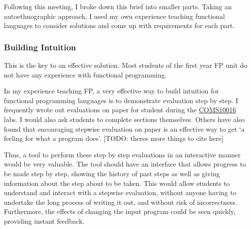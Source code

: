 Following this meeting, I broke down this brief into smaller parts. Taking an autoethnographic approach, I used my own experience teaching functional languages to consider solutions and come up with requirements for each part. 

\subsubsection{Building Intuition}
\label{building_intuition}
This is the key to an effective solution. Most students of the first year \ac{FP} unit do not have any experience with functional programming. 



In my experience teaching \ac{FP}, a very effective way to build intuition for functional programming languages is to demonstrate evaluation step by step. I frequently wrote out evaluations on paper for student during the \hyperref[COMS10016]{COMS10016} labs. I would also ask students to complete sections themselves. Others have also found that encouraging stepwise evaluation on paper is an effective way to get `a feeling for what a program does'. \cite{fp_first_year} [TODO: theres more things to cite here]

Thus, a tool to perform these step by step evaluations in an interactive manner would be very valuable. The tool should have an interface that allows progress to be made step by step, showing the history of past steps as well as giving information about the step about to be taken. This would allow students to understand and interact with a stepwise evaluation, without anyone having to undertake the long process of writing it out, and without risk of incorrectness. Furthermore, the effects of changing the input program could be seen quickly, providing instant feedback. 

